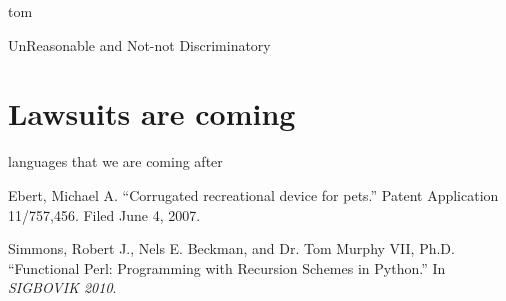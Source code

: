 \documentclass[acmtocl]%
{boviktrans}
\begin{document}
tom

UnReasonable and Not-not Discriminatory

\section{Lawsuits are coming}

languages that we are coming after


\begin{thebibliography}{1}


Ebert, Michael A.
\newblock ``Corrugated recreational device for pets.''
\newblock Patent Application 11/757,456.
\newblock Filed June 4, 2007.

Simmons, Robert J., Nels E. Beckman, and Dr. Tom Murphy VII, Ph.D.
\newblock ``Functional Perl: Programming with Recursion Schemes in Python.''
\newblock In {\it SIGBOVIK 2010}.

\end{thebibliography}
\end{document}
